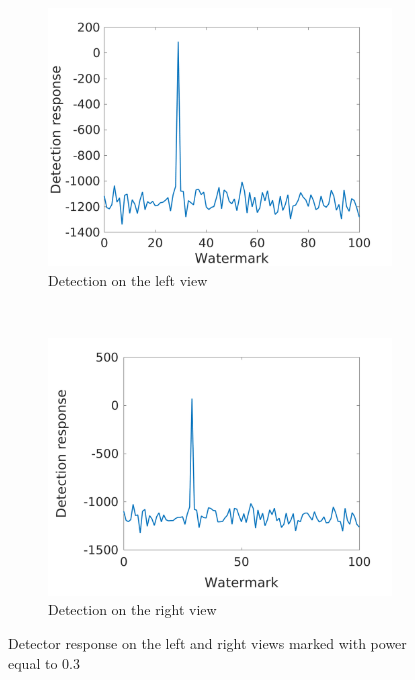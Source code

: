 \begin{figure}[h!]
    \centering
    \begin{subfigure}[t]{0.5\textwidth}
        \centering
       \includegraphics[width=1\textwidth]{./img/likelihood/correct_LikelihoodL_03.png}
          \caption{\small{Detection on the left view}}
          \label{fig:Ll03}

    \end{subfigure}%
    ~ 
    \begin{subfigure}[t]{0.5\textwidth}
        \centering
        \includegraphics[width=1\textwidth]{./img/likelihood/correct_LikelihoodLr_03.png}
           \caption{\small{Detection on the right view}}
           \label{fig:Lr03}
    \end{subfigure}
    \caption{Detector response on the left and right views marked with power equal to 0.3}
     \label{fig:Lr}
\end{figure}
